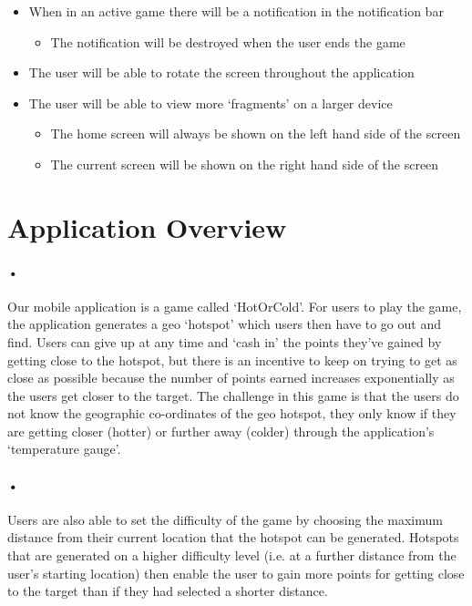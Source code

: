 \documentclass[10pt, a4paper]{article}
\begin{document}
\begin{itemize}
\item When in an active game there will be a notification in the notification bar
\begin{itemize}
\item The notification will be destroyed when the user ends the game
\end{itemize}

\item The user will be able to rotate the screen throughout the application

\item The user will be able to view more ‘fragments’ on a larger device
\begin{itemize}
\item The home screen will always be shown on the left hand side of the screen
\item The current screen will be shown on the right hand side of the screen
\end{itemize}

\end{itemize}


\section*{Application Overview}
\paragraph{•}
Our mobile application is a game called `HotOrCold'. For users to play the game, the application generates a geo `hotspot' which users then have to go out and find. Users can give up at any time and `cash in' the points they've gained by getting close to the hotspot, but there is an incentive to keep on trying to get as close as possible because the number of points earned increases exponentially as the users get closer to the target. The challenge in this game is that the users do not know the geographic co-ordinates of the geo hotspot, they only know if they are getting closer (hotter) or further away (colder) through the application's `temperature gauge'.

\paragraph*{•}
Users are also able to set the difficulty of the game by choosing the maximum distance from their current location that the hotspot can be generated. Hotspots that are generated on a higher difficulty level (i.e. at a further distance from the user's starting location) then enable the user to gain more points for getting close to the target than if they had selected a shorter distance.
\end{document}
